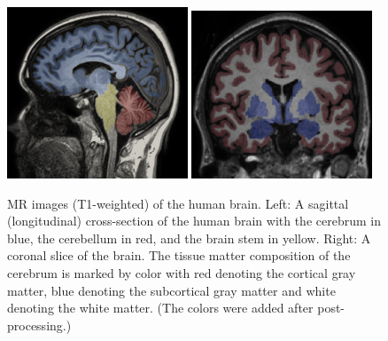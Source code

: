 \begin{figure}[t]
  \centering
  \includegraphics[width=0.48\textwidth]{./graphics/chp2/exp-brain.png}
  \includegraphics[width=0.48\textwidth]{./graphics/chp2/exp-matters.png}
  \caption{MR images (T1-weighted) of the human brain. Left: A sagittal
    (longitudinal) cross-section of the human brain with the cerebrum
    in blue, the cerebellum in red, and the brain stem in yellow. Right: A coronal
    slice of the brain. The tissue matter
    composition of the cerebrum is marked by color with red denoting
    the cortical gray matter, blue denoting the subcortical gray matter
    and white denoting the white matter. (The colors were added after
    post-processing.)}
  \label{fig:chp2:brain}
\end{figure}

